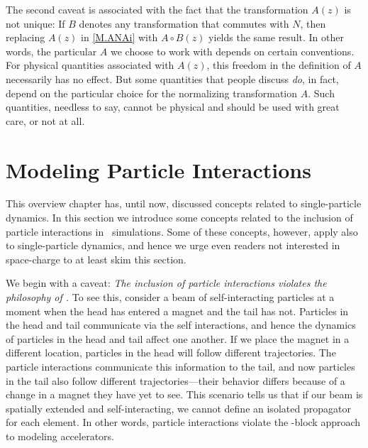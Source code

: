 The second caveat is associated with the fact that the
transformation $A(z)$ is not unique: If $B$ denotes any
transformation that commutes with $N$, then replacing $A(z)$ in
\eqref{M.ANAi} with $A \circ B(z)$ yields the same result. In
other words, the particular $A$ we choose to work with depends on
certain conventions. For physical quantities associated with $A(z)$,
this freedom in the definition of $A$ necessarily has no effect. But
some quantities%
that people discuss \emph{do}, in fact, depend on the particular
choice for the normalizing transformation $A$. Such quantities,
needless to say, cannot be physical and should be used with great
care, or not at all.\cite{Chao:2008:SLIMrevisted}


\section{Modeling Particle Interactions}
\label{sec:ptcl.intxns}

%
This overview chapter has, until now, discussed concepts related
to single-particle dynamics. In this section we introduce some
concepts related to the inclusion of particle interactions in
\PTC\ simulations. Some of these concepts, however, apply also
to single-particle dynamics, and hence we urge even readers not
interested in space-charge to at least skim this section.

We begin with a caveat: \emph{The inclusion of particle
interactions violates the philosophy of \PTC.} To see
this, consider a beam of self-interacting particles at
a moment when the head has entered a magnet and the tail
has not. Particles in the head and tail communicate via
the self interactions, and hence the dynamics of particles
in the head and tail affect one another. If we place the
magnet in a different location, particles in the head will
follow different trajectories. The particle interactions
communicate this information to the tail, and now particles
in the tail also follow different trajectories---their
behavior differs because of a change in a magnet they have
yet to see. This scenario tells us that if our beam is
spatially extended and self-interacting, we cannot define
an isolated propagator for each element. In other words,
particle interactions violate the \LEGO-block approach to
modeling accelerators.

